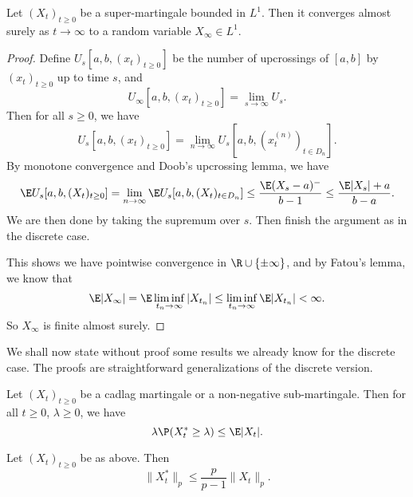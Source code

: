 \documentclass[a4paper]{article}
\begin{document}
\begin{thm}
  Let $(X_t)_{t \geq 0}$ be a super-martingale bounded in $L^1$. Then it converges almost surely as $t \to \infty$ to a random variable $X_\infty \in L^1$.
\end{thm}

\begin{proof}

  Define $U_s[a, b, (x_t)_{t \geq 0}]$ be the number of upcrossings of $[a, b]$ by $(x_t)_{t \geq 0}$ up to time $s$, and
  \[
    U_\infty[a, b, (x_t)_{t \geq 0}] = \lim_{s \to \infty} U_s.
  \]
  Then for all $s \geq 0$, we have
  \[
    U_s[a, b, (x_t)_{t \geq 0}] = \lim_{n \to \infty} U_s[a, b, (x_t^{(n)})_{t \in D_n}].
  \]
  By monotone convergence and Doob's upcrossing lemma, we have
  \[
    \E U_s[a, b, (X_t)_{t \geq 0}] = \lim_{n \to \infty} \E U_s[a, b, (X_t)_{t \in D_n}] \leq \frac{\E(X_s - a)^-}{b - 1} \leq \frac{\E |X_s| + a}{b - a}. %
  \]
  We are then done by taking the supremum over $s$. Then finish the argument as in the discrete case.

  This shows we have pointwise convergence in $\R \cup \{\pm \infty\}$, and by Fatou's lemma, we know that
  \[
    \E |X_\infty| = \E \liminf_{t_n \to \infty} |X_{t_n}| \leq \liminf_{t_n \to \infty} \E |X_{t_n}| < \infty.
  \]
  So $X_\infty$ is finite almost surely.
\end{proof}

We shall now state without proof some results we already know for the discrete case. The proofs are straightforward generalizations of the discrete version.

\begin{lemma}
  Let $(X_t)_{t \geq 0}$ be a cadlag martingale or a non-negative sub-martingale. Then for all $t \geq 0$, $\lambda \geq 0$, we have
  \[
    \lambda \P (X^*_t \geq \lambda)\leq \E |X_t|.
  \]
\end{lemma}

\begin{lemma}
  Let $(X_t)_{t \geq 0}$ be as above. Then
  \[
    \|X_t^*\|_p \leq \frac{p}{p - 1} \|X_t\|_p.
  \]
\end{lemma}
\end{document}
